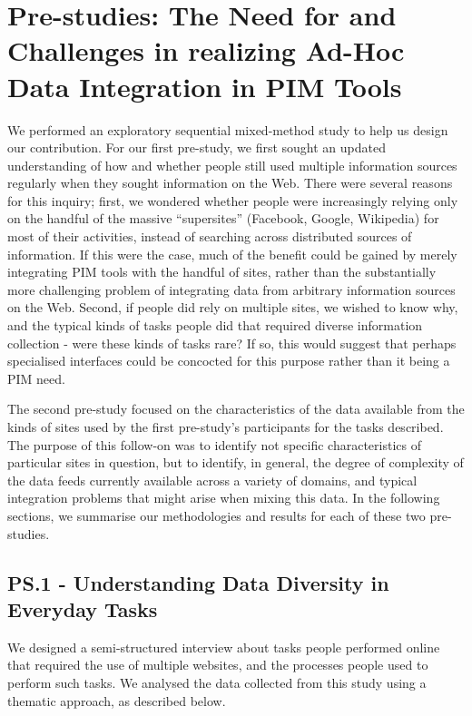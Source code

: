 \documentclass{sigchi}
\begin{document}
\section{Pre-studies: The Need for and Challenges in realizing Ad-Hoc Data Integration in PIM Tools}


We performed an exploratory sequential mixed-method study to help us design our contribution. For our first pre-study, we first sought an updated understanding of how and whether people still used multiple information sources regularly when they sought information on the Web. There were several reasons for this inquiry; first, we wondered whether people were increasingly relying only on the handful of the massive ``supersites'' (Facebook, Google, Wikipedia) for most of their activities, instead of  searching across distributed sources of information.  If this were the case, much of the benefit could be gained by merely integrating PIM tools with the handful of sites, rather than the substantially more challenging problem of integrating data from arbitrary information sources on the Web.   Second, if people did rely on multiple sites, we wished to know why, and the typical kinds of tasks people did that required diverse information collection - were these kinds of tasks rare?  If so, this would suggest that perhaps specialised interfaces could be concocted for this purpose rather than it being a PIM need. 

The second pre-study focused on the characteristics of the data available from the kinds of sites used by the first pre-study's participants for the tasks described. The purpose of this follow-on  was to identify not specific characteristics of particular sites in question, but to identify, in general, the degree of complexity of the data feeds currently available across a variety of domains, and typical integration problems that might arise when mixing this data. In the following sections, we summarise our methodologies and results for each of these two pre-studies.


\subsection{PS.1 - Understanding Data Diversity in Everyday Tasks}
We designed a semi-structured interview about tasks people performed online that required the use of multiple websites, and the processes people used to perform such tasks.  We analysed the data collected from this study using a thematic approach, as described below. 
\end{document}
